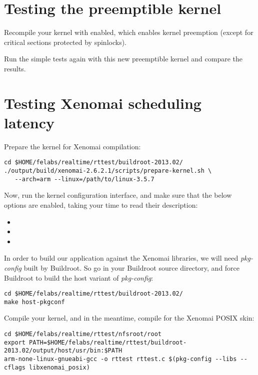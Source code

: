 \section{Testing the preemptible kernel}

Recompile your kernel with  enabled, which
enables kernel preemption (except for critical sections protected by
spinlocks).

Run the simple tests again with this new preemptible kernel and compare
the results.

\section{Testing Xenomai scheduling latency}

Prepare the kernel for Xenomai compilation:
\begin{verbatim}
cd $HOME/felabs/realtime/rttest/buildroot-2013.02/
./output/build/xenomai-2.6.2.1/scripts/prepare-kernel.sh \
   --arch=arm --linux=/path/to/linux-3.5.7
\end{verbatim}

Now, run the kernel configuration interface, and make sure that
the below options are enabled, taking your time to read their
description:

\begin{itemize}
\item {}
\item {}
\item {}
\end{itemize}

In order to build our application against the Xenomai libraries, we
will need {\em pkg-config} built by Buildroot. So go in your Buildroot
source directory, and force Buildroot to build the host variant of
{\em pkg-config}:

\begin{verbatim}
cd $HOME/felabs/realtime/rttest/buildroot-2013.02/
make host-pkgconf
\end{verbatim}

Compile your kernel, and in the meantime,
compile  for the Xenomai POSIX skin:

\small
\begin{verbatim}
cd $HOME/felabs/realtime/rttest/nfsroot/root
export PATH=$HOME/felabs/realtime/rttest/buildroot-2013.02/output/host/usr/bin:$PATH
arm-none-linux-gnueabi-gcc -o rttest rttest.c $(pkg-config --libs --cflags libxenomai_posix)
\end{verbatim}
\normalsize

